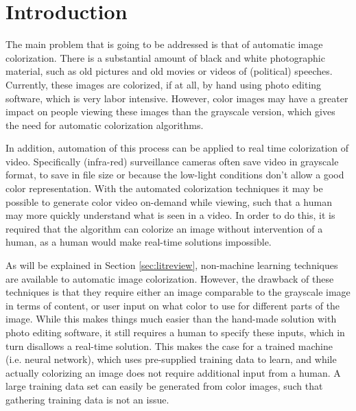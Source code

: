 \section{Introduction}
The main problem that is going to be addressed is that of automatic image colorization. There is a substantial amount of black and white photographic material, such as old pictures and old movies or videos of (political) speeches. Currently, these images are colorized, if at all, by hand using photo editing software, which is very labor intensive. However, color images may have a greater impact on people viewing these images than the grayscale version, which gives the need for automatic colorization algorithms.

In addition, automation of this process can be applied to real time colorization of video. Specifically (infra-red) surveillance cameras often save video in grayscale format, to save in file size or because the low-light conditions don't allow a good color representation. With the automated colorization techniques it may be possible to generate color video on-demand while viewing, such that a human may more quickly understand what is seen in a video. In order to do this, it is required that the algorithm can colorize an image without intervention of a human, as a human would make real-time solutions impossible.

As will be explained in Section \ref{sec:litreview}, non-machine learning techniques are available to automatic image colorization. However, the drawback of these techniques is that they require either an image comparable to the grayscale image in terms of content, or user input on what color to use for different parts of the image. While this makes things much easier than the hand-made solution with photo editing software, it still requires a human to specify these inputs, which in turn disallows a real-time solution. This makes the case for a trained machine (i.e. neural network), which uses pre-supplied training data to learn, and while actually colorizing an image does not require additional input from a human. A large training data set can easily be generated from color images, such that gathering training data is not an issue.
